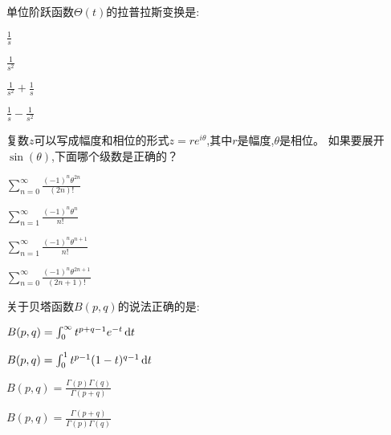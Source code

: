 \documentclass{njustexam}
\begin{document}




\begin{problem}
  单位阶跃函数$\Theta(t)$的拉普拉斯变换是:
  \begin{abcd}
    \item $\frac{1}{s}$
    \item $\frac{1}{s^2}$
    \item $\frac{1}{s^2} + \frac{1}{s}$
    \item $\frac{1}{s} - \frac{1}{s^2}$
  \end{abcd}

\end{problem}

\begin{problem}
复数$z$可以写成幅度和相位的形式$z = re^{i\theta}$,其中$r$是幅度,$\theta$是相位。
如果要展开$\sin(\theta)$,下面哪个级数是正确的？ 
\begin{abcd}
  \item $\sum_{n=0}^{\infty} \frac{(-1)^n \theta^{2n}}{(2n)!}$
  \item $\sum_{n=1}^{\infty} \frac{(-1)^n \theta^n}{n!}$
  \item $\sum_{n=1}^{\infty} \frac{(-1)^n \theta^{n+1}}{n!}$
  \item $\sum_{n=0}^{\infty} \frac{(-1)^n \theta^{2n+1}}{(2n+1)!}$

\end{abcd}
\end{problem}








\begin{problem}
  关于贝塔函数$B(p, q)$的说法正确的是:
\begin{abcd}
  \item $B(p, q) = \int_{0}^{\infty} t^{p+q-1}e^{-t} \mathop{}\!\mathrm{d} t$
  \item $B(p, q) = \int_{0}^{1} t^{p-1}(1-t)^{q-1} \mathop{}\!\mathrm{d} t$
  \item $B(p, q) = \frac{\Gamma(p)\Gamma(q)}{\Gamma(p+q)}$
  \item $B(p, q) = \frac{\Gamma(p+q)}{\Gamma(p)\Gamma(q)}$
\end{abcd}
\end{problem}
\end{document}
